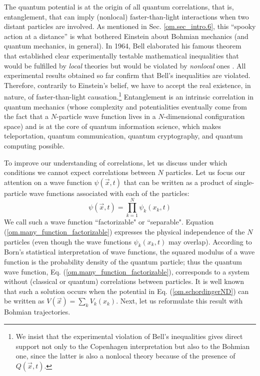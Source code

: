 \documentclass[nofootinbib, secnumarabic, amsmath, nobibnotes,11pt,aps,pra, floatfix]{revtex4-1}
\newcommand{\sref}[1]{Sec. \ref{#1}}
\newcommand{\eref}[1]{Eq. (\ref{#1})}
\newcommand{\Eref}[1]{Equation (\ref{#1})}
\begin{document}
The quantum potential is at the origin of all quantum correlations,
that is, entanglement, that can imply (nonlocal) faster-than-light
interactions when two distant particles are involved. As mentioned
in \sref{om.sec_intro.6}, this ``spooky action at a distance'' is
what bothered Einstein about Bohmian mechanics (and quantum
mechanics, in general). In 1964, Bell elaborated his famous theorem
that established clear experimentally testable mathematical
inequalities that would be fulfilled by \textit{local} theories but
would be violated by \textit{nonlocal} ones
\cite{om.Bell1964}. All experimental results obtained so far confirm
that Bell's inequalities are violated. Therefore, contrarily to
Einstein's belief, we have to accept the real existence, in nature,
of faster-than-light causation.\footnote{We insist that the
experimental violation of Bell's inequalities gives direct support
not only to the Copenhagen interpretation but also to the Bohmian
one, since the latter is also a nonlocal theory because of the presence of
$Q(\vec{x},t)$.} Entanglement is an intrinsic correlation in
quantum mechanics (whose complexity and potentialities eventually
come from the fact that a $N$-particle wave function lives in a
$N$-dimensional configuration space) and is at the core of quantum
information science, which makes teleportation, quantum
communication, quantum cryptography, and quantum computing possible.

To improve our understanding of correlations, let us discuss under
which conditions we cannot expect correlations between $N$ particles. Let us focus our attention on a
wave function $\psi(\vec{x},t)$ that can be written as a product of
single-particle wave functions associated with each of the
particles:
\begin{equation}
\label{om.many_function_factorizable}
\psi(\vec{x},t) = \prod_{k = 1}^N \psi_k(x_k,t)
\end{equation}
We call such a wave function ``factorizable" or ``separable". \Eref{om.many_function_factorizable} expresses the physical independence of the $N$ particles (even though the wave functions $\psi_k(x_k,t)$ may overlap). According to Born's statistical interpretation of wave functions, the squared modulus of a wave function is the probability density of the quantum particle; thus the quantum wave function, \eref{om.many_function_factorizable}, corresponds to a system without (classical or quantum) correlations between particles. It is well known that such a solution occurs when the potential in \eref{om.schordingerND} can be written as $V(\vec{x}) = \sum_k V_k(x_k)$. Next, let us reformulate this result with Bohmian trajectories.
\end{document}
